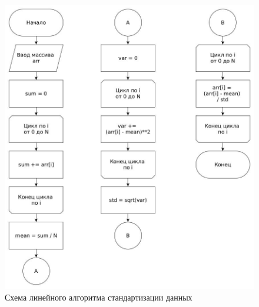 \FloatBarrier
\begin{figure}[hp]
	\label{classic}
	\begin{center}
		\includegraphics[width=\linewidth]{graph/classic.jpg}
	\end{center}
	\caption{Схема линейного алгоритма стандартизации данных}
\end{figure}
\FloatBarrier

